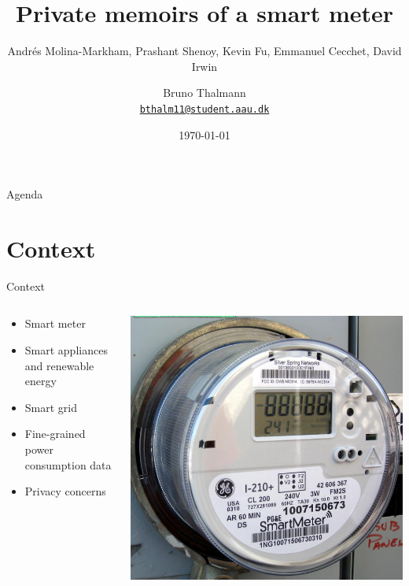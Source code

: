 \documentclass[10pt]{beamer}
\title{Private memoirs of a smart meter}
\subtitle{Andrés Molina-Markham, Prashant Shenoy, Kevin Fu, Emmanuel Cecchet, David Irwin}  %
\date{\today}
\author{
  Bruno Thalmann\\
  \href{mailto:bthalm11@student.aau.dk}{{\tt bthalm11@student.aau.dk}}
}
\institute[
  Dept.\ of Computer Science\\
  Aalborg University\\
  Denmark
] %
{%
  Department of Computer Science\\
  Aalborg University\\
  Denmark
  
}
\begin{document}
{\aauwavesbg%
\begin{frame} %
  \titlepage
\end{frame}}

\begin{frame}{Agenda}{}
\tableofcontents
\end{frame}

\section{Context}
\begin{frame}{Context}
  \begin{columns}[T]
    \begin{column}{.5\textwidth}
      \begin{itemize}
        \itemsep1em
  \item Smart meter
  \item Smart appliances and renewable energy
  \item Smart grid
  \item Fine-grained power consumption data
  \item Privacy concerns
  \end{itemize}
    \end{column}
    \begin{column}{.5\textwidth}
      \includegraphics[scale=.5]{graphics/smart-meter.jpg}
    \end{column}
  \end{columns}
\end{frame}
\end{document}
